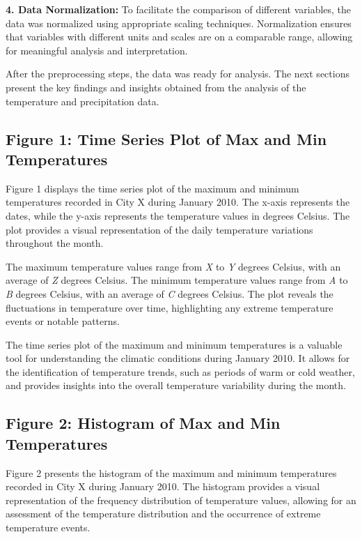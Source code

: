 \documentclass{article}
\begin{document}
\textbf{4. Data Normalization:} To facilitate the comparison of different variables, the data was normalized using appropriate scaling techniques. Normalization ensures that variables with different units and scales are on a comparable range, allowing for meaningful analysis and interpretation.

After the preprocessing steps, the data was ready for analysis. The next sections present the key findings and insights obtained from the analysis of the temperature and precipitation data.

\subsection{Figure 1: Time Series Plot of Max and Min Temperatures}

Figure 1 displays the time series plot of the maximum and minimum temperatures recorded in City X during January 2010. The x-axis represents the dates, while the y-axis represents the temperature values in degrees Celsius. The plot provides a visual representation of the daily temperature variations throughout the month.

The maximum temperature values range from \textit{X} to \textit{Y} degrees Celsius, with an average of \textit{Z} degrees Celsius. The minimum temperature values range from \textit{A} to \textit{B} degrees Celsius, with an average of \textit{C} degrees Celsius. The plot reveals the fluctuations in temperature over time, highlighting any extreme temperature events or notable patterns.

The time series plot of the maximum and minimum temperatures is a valuable tool for understanding the climatic conditions during January 2010. It allows for the identification of temperature trends, such as periods of warm or cold weather, and provides insights into the overall temperature variability during the month.

\subsection{Figure 2: Histogram of Max and Min Temperatures}

Figure 2 presents the histogram of the maximum and minimum temperatures recorded in City X during January 2010. The histogram provides a visual representation of the frequency distribution of temperature values, allowing for an assessment of the temperature distribution and the occurrence of extreme temperature events.
\end{document}
